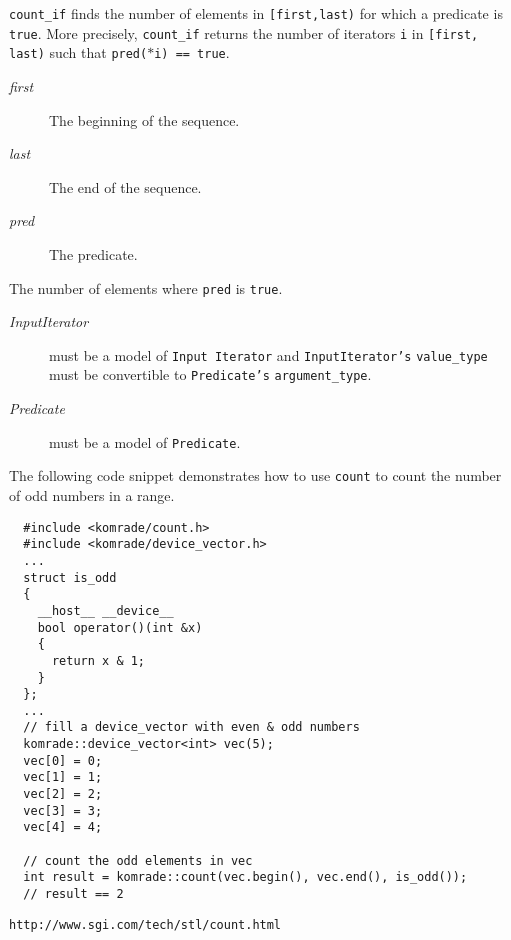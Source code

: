 {\tt count\_\-if} finds the number of elements in {\tt [first,last)} for which a predicate is {\tt true}. More precisely, {\tt count\_\-if} returns the number of iterators {\tt i} in {\tt [first, last)} such that {\tt pred($\ast$i) == true}.

\begin{Desc}
\item[Parameters:]
\begin{description}
\item[{\em first}]The beginning of the sequence. \item[{\em last}]The end of the sequence. \item[{\em pred}]The predicate. \end{description}
\end{Desc}
\begin{Desc}
\item[Returns:]The number of elements where {\tt pred} is {\tt true}.\end{Desc}
\begin{Desc}
\item[Template Parameters:]
\begin{description}
\item[{\em InputIterator}]must be a model of {\tt Input Iterator} and {\tt InputIterator's} {\tt value\_\-type} must be convertible to {\tt Predicate's} {\tt argument\_\-type}. \item[{\em Predicate}]must be a model of {\tt Predicate}.\end{description}
\end{Desc}
The following code snippet demonstrates how to use {\tt count} to count the number of odd numbers in a range. 

\begin{Code}\begin{verbatim}  #include <komrade/count.h>
  #include <komrade/device_vector.h>
  ...
  struct is_odd
  {
    __host__ __device__
    bool operator()(int &x)
    {
      return x & 1;
    }
  };
  ...
  // fill a device_vector with even & odd numbers
  komrade::device_vector<int> vec(5);
  vec[0] = 0;
  vec[1] = 1;
  vec[2] = 2;
  vec[3] = 3;
  vec[4] = 4;

  // count the odd elements in vec
  int result = komrade::count(vec.begin(), vec.end(), is_odd());
  // result == 2
\end{verbatim}
\end{Code}



\begin{Desc}
\item[See also:]{\tt http://www.sgi.com/tech/stl/count.html} \end{Desc}
